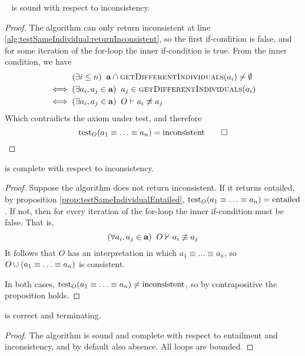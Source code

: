 \documentclass[paper.tex]{subfiles}
\begin{document}
\begin{proposition}
  \sloppy~
   is sound with respect to inconsistency.
\end{proposition}
\begin{proof}
  The algorithm can only return inconsistent at line \ref{alg:testSameIndividual:returnInconsistent}, so the first if-condition is false, and for some iteration of the for-loop the inner if-condition is true.  From the inner condition, we have
  \begin{align*}
    & (\exists i \le n) \;\; \mathbf{a} \intersect \Call{getDifferentIndividuals}{a_i} \ne \emptyset \\
    \iff{}& (\exists a_i, a_j \in \mathbf{a}) \;\; a_j \in \Call{getDifferentIndividuals}{a_i} \\
    \iff{}& (\exists a_i, a_j \in \mathbf{a}) \;\; O \sementails a_i \not\equiv a_j
  \end{align*}
  Which contradicts the axiom under test, and therefore
  \[ \operatorname{test}_O(a_1 \equiv \ldots \equiv a_n) = \mathrm{inconsistent} \qed \]
\end{proof}

\begin{proposition}
   is complete with respect to inconsistency.
\end{proposition}
\begin{proof}
  Suppose the algorithm does not return inconsistent.  If it returns entailed, by proposition \ref{prop:testSameIndividualEntailed}, $\operatorname{test}_O(a_1 \equiv \ldots \equiv a_n) = \mathrm{entailed}$.  If not, then for every iteration of the for-loop the inner if-condition must be false.  That is,
  \[ (\forall a_i, a_j \in \mathbf{a}) \;\; O \nvdash a_i \not\equiv a_j \]
  It follows that $O$ has an interpretation in which $a_1 \equiv \ldots \equiv a_n$, so $O \cup (a_1 \equiv \ldots \equiv a_n)$ is consistent.

  In both cases, $\operatorname{test}_O(a_1 \equiv \ldots \equiv a_n) \ne \mathrm{inconsistent}$, so by contrapositive the proposition holds.
\end{proof}

\begin{theorem}
  \label{thm:testSameIndividual}
   is correct and terminating.
\end{theorem}
\begin{proof}
  The algorithm is sound and complete with respect to entailment and inconsistency, and by default also absence.  All loops are bounded.
\end{proof}
\end{document}
